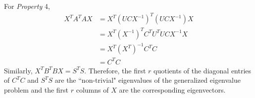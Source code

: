             For \textit{Property} 4, 
                \begin{align*}
                    X^TA^TAX &= X^T(UCX^{-1})^T(UCX^{-1})X \\
                             &= X^T(X^{-1})^{T}C^TU^TUCX^{-1}X \\
                             &= X^T(X^T)^{-1}C^TC \\
                             &= C^TC
                \end{align*}
            Similarly, $X^TB^TBX = S^TS$. Therefore, the first $r$ quotients of the diagonal entries of $C^TC$ and $S^TS$ are the ``non-trivial" eigenvalues of the generalized eigenvalue problem and the first $r$ columns of $X$ are the corresponding eigenvectors.

        
        

